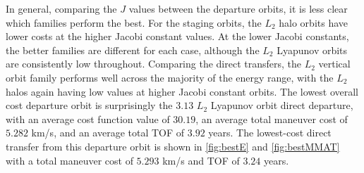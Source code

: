 In general, comparing the $J$ values between the departure orbits, it is less clear which families
perform the best. For the staging orbits, the $L_{2}$ halo orbits have lower costs at the higher
Jacobi constant values. At the lower Jacobi constants, the better families are different for each
case, although the $L_{2}$ Lyapunov orbits are consistently low throughout. Comparing the direct
transfers, the $L_{2}$ vertical orbit family performs well across the majority of the energy range,
with the $L_{2}$ halos again having low values at higher Jacobi constant orbits. The lowest overall
cost departure orbit is surprisingly the $3.13$ $L_{2}$ Lyapunov orbit direct departure, with an
average cost function value of $30.19$, an average total maneuver cost of $5.282$ km/s, and an
average total TOF of $3.92$ years. The lowest-cost direct transfer from this departure orbit is
shown in \cref{fig:bestE} and \cref{fig:bestMMAT} with a total maneuver cost of $5.293$ km/s and
TOF of $3.24$ years.

